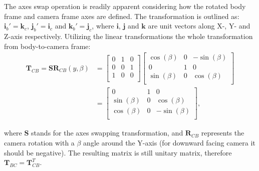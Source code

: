 The axes swap operation is readily apparent considering how the rotated body frame and camera frame axes are defined. The transformation is outlined as: $\mathbf{i}_b'=\mathbf{k}_c$, $\mathbf{j}_b'=\mathbf{i}_c$ and $\mathbf{k}_b'=\mathbf{j}_c$, where $\mathbf{i}$, $\mathbf{j}$ and $\mathbf{k}$ are unit vectors along X-, Y- and Z-axis respectively. Utilizing the linear transformations the whole transformation from body-to-camera frame:
\begin{equation}
\begin{aligned}
    \mathbf{T}_{CB}=\mathbf{S}\mathbf{R}_{CB}(y,\beta) &= \begin{bmatrix}
            0 & 1 & 0 \\
            0 & 0 & 1 \\
            1 & 0 & 0 \\
        \end{bmatrix}
        \begin{bmatrix}
            \cos(\beta) & 0 & -\sin(\beta) \\
            0 & 1 & 0 \\
            \sin(\beta) & 0 & \cos(\beta) \\
        \end{bmatrix} \\ &= \begin{bmatrix}
            0 & 1 & 0 \\
            \sin(\beta) & 0 & \cos(\beta) \\
            \cos(\beta) & 0 & -\sin(\beta) \\
        \end{bmatrix},
\end{aligned}
\end{equation}

where $\mathbf{S}$ stands for the axes swapping transformation, and $\mathbf{R}_{CB}$ represents the camera rotation with a $\beta$ angle around the Y-axis (for downward facing camera it should be negative). The resulting matrix is still unitary matrix, therefore $\mathbf{T}_{BC}=\mathbf{T}_{CB}^T$.

